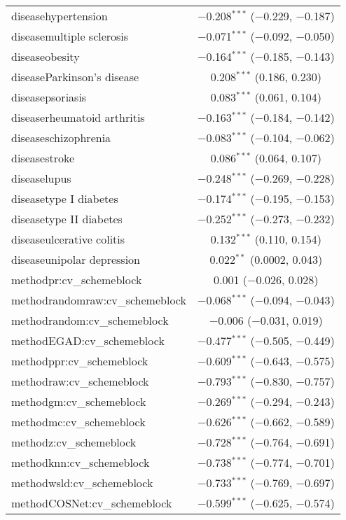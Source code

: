 \begin{table}[!htbp]
\begin{tabular}{@{\extracolsep{5pt}}lc}
  diseasehypertension & $-$0.208$^{***}$ ($-$0.229, $-$0.187) \\ 
  diseasemultiple sclerosis & $-$0.071$^{***}$ ($-$0.092, $-$0.050) \\ 
  diseaseobesity & $-$0.164$^{***}$ ($-$0.185, $-$0.143) \\ 
  diseaseParkinson's disease & 0.208$^{***}$ (0.186, 0.230) \\ 
  diseasepsoriasis & 0.083$^{***}$ (0.061, 0.104) \\ 
  diseaserheumatoid arthritis & $-$0.163$^{***}$ ($-$0.184, $-$0.142) \\ 
  diseaseschizophrenia & $-$0.083$^{***}$ ($-$0.104, $-$0.062) \\ 
  diseasestroke & 0.086$^{***}$ (0.064, 0.107) \\ 
  diseaselupus & $-$0.248$^{***}$ ($-$0.269, $-$0.228) \\ 
  diseasetype I diabetes & $-$0.174$^{***}$ ($-$0.195, $-$0.153) \\ 
  diseasetype II diabetes & $-$0.252$^{***}$ ($-$0.273, $-$0.232) \\ 
  diseaseulcerative colitis & 0.132$^{***}$ (0.110, 0.154) \\ 
  diseaseunipolar depression & 0.022$^{**}$ (0.0002, 0.043) \\ 
  methodpr:cv\_schemeblock & 0.001 ($-$0.026, 0.028) \\ 
  methodrandomraw:cv\_schemeblock & $-$0.068$^{***}$ ($-$0.094, $-$0.043) \\ 
  methodrandom:cv\_schemeblock & $-$0.006 ($-$0.031, 0.019) \\ 
  methodEGAD:cv\_schemeblock & $-$0.477$^{***}$ ($-$0.505, $-$0.449) \\ 
  methodppr:cv\_schemeblock & $-$0.609$^{***}$ ($-$0.643, $-$0.575) \\ 
  methodraw:cv\_schemeblock & $-$0.793$^{***}$ ($-$0.830, $-$0.757) \\ 
  methodgm:cv\_schemeblock & $-$0.269$^{***}$ ($-$0.294, $-$0.243) \\ 
  methodmc:cv\_schemeblock & $-$0.626$^{***}$ ($-$0.662, $-$0.589) \\ 
  methodz:cv\_schemeblock & $-$0.728$^{***}$ ($-$0.764, $-$0.691) \\ 
  methodknn:cv\_schemeblock & $-$0.738$^{***}$ ($-$0.774, $-$0.701) \\ 
  methodwsld:cv\_schemeblock & $-$0.733$^{***}$ ($-$0.769, $-$0.697) \\ 
  methodCOSNet:cv\_schemeblock & $-$0.599$^{***}$ ($-$0.625, $-$0.574) \\ 

\end{tabular}
\end{table}
